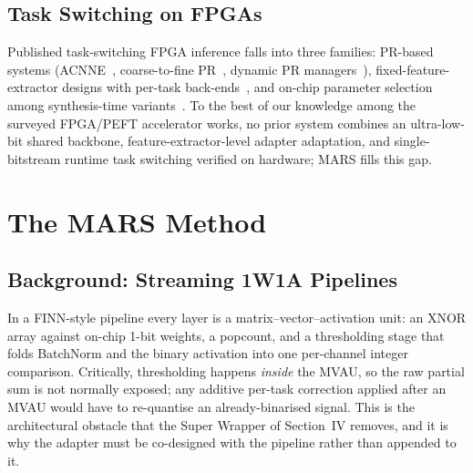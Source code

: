 \documentclass[journal]{IEEEtran}
\begin{document}
\subsection{Task Switching on FPGAs}
Published task-switching FPGA inference falls into three families: PR-based systems (ACNNE~\cite{Huang2024ACNNE}, coarse-to-fine PR~\cite{Rangsikunpum2024CoarseToFine}, dynamic PR managers~\cite{Boudjadar2025DynamicFPGA,Kang2025RuntimeRobust}), fixed-feature-extractor designs with per-task back-ends~\cite{Whatmough2019FixyNN}, and on-chip parameter selection among synthesis-time variants~\cite{ElBouazzaoui2025NeuroAdaptive}. To the best of our knowledge among the surveyed FPGA/PEFT accelerator works, no prior system combines an ultra-low-bit shared backbone, feature-extractor-level adapter adaptation, and single-bitstream runtime task switching verified on hardware; MARS fills this gap.

\section{The MARS Method}
\subsection{Background: Streaming 1W1A Pipelines}
In a FINN-style pipeline every layer is a matrix--vector--activation unit: an XNOR array against on-chip 1-bit weights, a popcount, and a thresholding stage that folds BatchNorm and the binary activation into one per-channel integer comparison. Critically, thresholding happens \emph{inside} the MVAU, so the raw partial sum is not normally exposed; any additive per-task correction applied after an MVAU would have to re-quantise an already-binarised signal. This is the architectural obstacle that the Super Wrapper of Section~IV removes, and it is why the adapter must be co-designed with the pipeline rather than appended to it.
\end{document}

